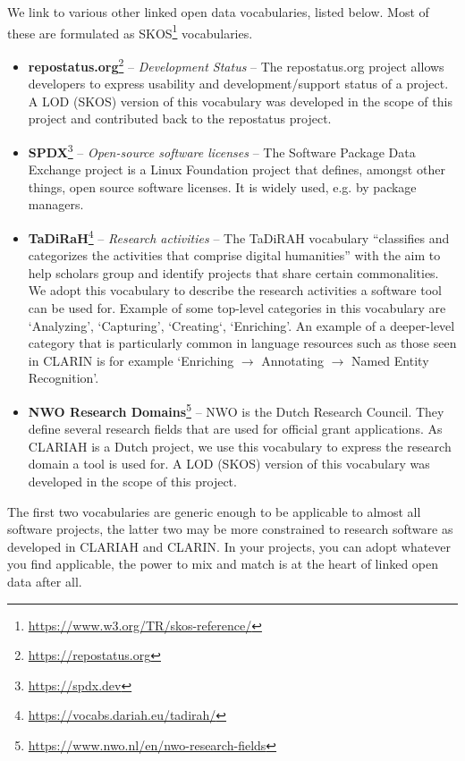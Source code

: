 \documentclass[a4paper,11pt]{article}
\begin{document}
We link to various other linked open data vocabularies, listed below. Most of these are
formulated as SKOS\footnote{\url{https://www.w3.org/TR/skos-reference/}}
vocabularies.

\begin{itemize}
\item \textbf{repostatus.org}\footnote{\url{https://repostatus.org}} -- \emph{Development Status} -- The repostatus.org project allows developers to express usability and development/support status of a project.
A LOD (SKOS) version of this vocabulary was developed in the scope of this project and contributed back to the repostatus project.
\item \textbf{SPDX}\footnote{\url{https://spdx.dev}} -- \emph{Open-source software licenses} -- The Software Package Data Exchange project is a Linux Foundation project that defines, amongst other things, open source software licenses. It is widely used, e.g. by package managers. 
\item \textbf{TaDiRaH}\footnote{\url{https://vocabs.dariah.eu/tadirah/}} -- \emph{Research activities} -- The TaDiRAH vocabulary ``classifies and categorizes the activities that comprise digital humanities'' \citep{TADIRAH} with the aim to help scholars group and identify projects that share certain commonalities.
We adopt this vocabulary to describe the research activities a software tool can be used for. Example of some top-level categories in this vocabulary are `Analyzing', `Capturing', `Creating`, `Enriching'. An example of a deeper-level category that is particularly common in language resources such as those 
seen in CLARIN is for example `Enriching $\rightarrow$ Annotating $\rightarrow$ Named Entity Recognition'.
\item \textbf{NWO Research Domains}\footnote{\url{https://www.nwo.nl/en/nwo-research-fields}} -- NWO is the Dutch Research Council. They define several research fields that are used for official grant applications. As CLARIAH is a Dutch project, we use this vocabulary to express the research domain a tool is used for. A LOD (SKOS) version of this vocabulary was developed in the scope of this project.
\end{itemize}

The first two vocabularies are generic enough to be applicable to almost all
software projects, the latter two may be more constrained to research software
as developed in CLARIAH and CLARIN. In your projects, you can adopt whatever you
find applicable, the power to mix and match is at the heart of linked open
data after all.
\end{document}
